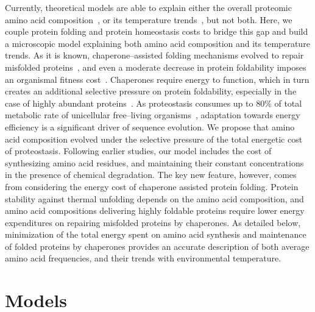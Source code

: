 \documentclass[10pt,letterpaper]{article}
\begin{document}
Currently, theoretical models are able to explain either the overall proteomic amino acid composition~\cite{Seligmann2003CostMinimization,Heizer2011Amino,Krick2014Amino}, or its temperature trends~\cite{Berezovsky2007Positive,Venev2015Massively}, but not both. Here, we couple protein folding and protein homeostasis costs to bridge this gap  and build a microscopic model explaining both amino acid composition and its temperature trends. As it is known, chaperone--assisted folding mechanisms evolved to repair misfolded proteins~\cite{Hartl2011Molecular}, and even a moderate decrease in protein foldability imposes an organismal fitness cost~\cite{Drummond2008MistranslationInduced,Samerotte2011Misfolded}. Chaperones require energy to function, which in turn creates an additional selective pressure on protein foldability, especially in the case of highly abundant proteins~\cite{Kepp2014Model}. As proteostasis consumes up to 80\% of total metabolic rate of unicellular free--living organisms~\cite{Kepp2014Model}, adaptation towards energy efficiency is a significant driver of sequence evolution. We propose that amino acid composition evolved under the selective pressure of the total energetic cost of proteostasis. Following earlier studies, our model includes the cost of synthesizing amino acid residues, and maintaining their constant concentrations in the presence of chemical degradation. The key new feature, however, comes from considering the energy cost of chaperone assisted protein folding. Protein stability against thermal unfolding depends on the amino acid composition, and amino acid compositions delivering highly foldable proteins require lower energy expenditures on repairing misfolded proteins by chaperones. As detailed below, minimization of the total energy spent on amino acid synthesis and maintenance of folded proteins by chaperones provides an accurate description of both average amino acid frequencies, and their trends with environmental temperature.

\section*{Models}
\end{document}
